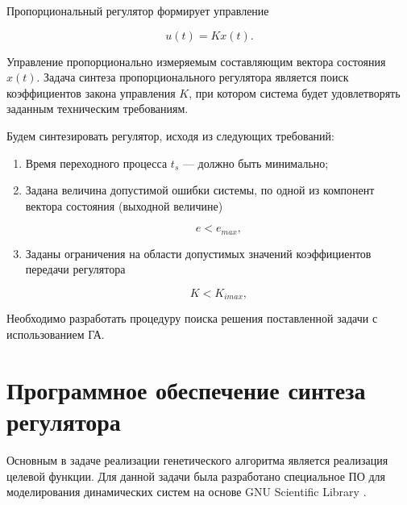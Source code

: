 \documentclass[russian,utf8,emptystyle,12pt]{eskdtext}
\begin{document}
        Пропорциональный регулятор формирует управление
        
        \begin{equation}
            u(t) = K x(t).
            \label{eq:control}
        \end{equation}
        
        Управление пропорционально измеряемым составляющим вектора состояния $x(t)$. Задача синтеза пропорционального регулятора является поиск коэффициентов закона управления $K$, при котором система будет удовлетворять заданным техническим требованиям.
        
        Будем синтезировать регулятор, исходя из следующих требований:
        
        \begin{enumerate}
        	\item Время переходного процесса $t_s$ --- должно быть минимально;
        	\item Задана величина допустимой ошибки системы, по одной из компонент вектора состояния (выходной величине)
        	
		        \begin{equation}
		            e < e_{max},
		            \label{eq:max-e}              
		        \end{equation}
		            
        	\item Заданы ограничения на области допустимых значений коэффициентов передачи регулятора
        	
		        \begin{equation}
		            K < K_{imax}, 
		            \label{eq:max-k}              
		        \end{equation}
		        
        \end{enumerate}
        
        Необходимо разработать процедуру поиска решения поставленной задачи с использованием ГА.
        
        
    
	\section{Программное обеспечение синтеза регулятора}	
	
	    Основным в задаче реализации генетического алгоритма является реализация целевой функции. Для данной задачи была разработано специальное ПО для моделирования динамических систем на основе GNU Scientific Library \cite{bib:air-fish, bib:gsl}. 
	    
\end{document}
